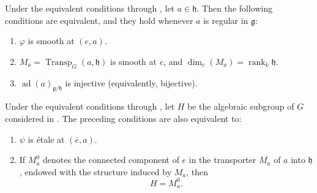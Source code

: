 \begin{corollary}
Under the equivalent conditions  through , let
\(a\in\mathfrak h\). Then the following conditions are equivalent, and
they hold whenever \(a\) is regular in \(\mathfrak g\):
\begin{enumerate}
  \item[(i)]
  \(\varphi\) is smooth at \((e,a)\).

  \item[(ii)]
  \(M_a=\operatorname{Transp}_G(a,\mathfrak h)\) is smooth at \(e\),
  and
  \(\dim_e(M_a)=\operatorname{rank}_k\mathfrak h\).

  \item[(iii)]
  \(\operatorname{ad}(a)_{\mathfrak g/\mathfrak h}\) is injective
  (equivalently, bijective).
\end{enumerate}
Under the equivalent conditions  through , let \(H\) be the
algebraic subgroup of \(G\) considered in . The preceding
conditions are also equivalent to:
\begin{enumerate}
  \item[(iv)]
  \(\psi\) is étale at \((\overline e,a)\).

  \item[(v)]
  If \(M_a^0\) denotes the connected component of \(e\) in the
  transporter \(M_a\) of \(a\) into \(\mathfrak h\), endowed with the
  structure induced by \(M_a\), then
  \[
    H=M_a^0.
  \]
\end{enumerate}
\end{corollary}

